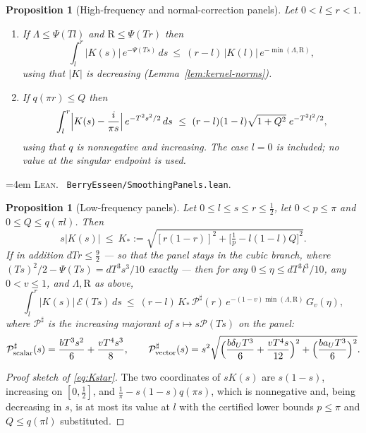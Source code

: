 \documentclass[10pt,a4paper]{article}
\theoremstyle{plain}
\newtheorem{proposition}[theorem]{Proposition}
\theoremstyle{definition}
\newcommand{\file}[1]{\texttt{#1}}
\newenvironment{leanref}%
  {\par\addvspace{3pt}\begingroup\sloppy\emergencystretch=4em
   \noindent\footnotesize\textsc{Lean.}\ \ignorespaces}%
  {\par\endgroup\addvspace{3pt}}
\begin{document}
\begin{proposition}[High-frequency and normal-correction panels]
\label{prop:high-normal-panel}
Let $0<l\le r<1$.
\begin{enumerate}[label=(\alph*),leftmargin=2.4em]
\item If $\Lambda\le\Psi(Tl)$ and $\mathrm{R}\le\Psi(Tr)$ then
  \[
    \int_l^r |K(s)|\,e^{-\Psi(Ts)}\,ds
    \ \le\ (r-l)\,|K(l)|\,e^{-\min(\Lambda,\mathrm R)} ,
  \]
  using that $|K|$ is decreasing (Lemma~\ref{lem:kernel-norms}).
\item If $q(\pi r)\le Q$ then
  \[
    \int_l^r \Bigl|K(s)-\frac{i}{\pi s}\Bigr|\,e^{-T^2s^2/2}\,ds
    \ \le\ (r-l)(1-l)\sqrt{1+Q^2}\;e^{-T^2l^2/2} ,
  \]
  using that $q$ is nonnegative and increasing. The case $l=0$ is included; no
  value at the singular endpoint is used.
\end{enumerate}
\end{proposition}

\begin{leanref}
\file{BerryEsseen/SmoothingPanels.lean}.
\end{leanref}

\begin{proposition}[Low-frequency panels]\label{prop:low-panel}
Let $0\le l\le s\le r\le\tfrac12$, let $0<p\le\pi$ and $0\le Q\le q(\pi l)$.
Then
\begin{equation}\label{eq:Kstar}
  s|K(s)| \ \le\ K_* := \sqrt{[r(1-r)]^2+\bigl[\tfrac1p-l(1-l)Q\bigr]^2} .
\end{equation}
If in addition $dTr\le\tfrac92$ --- so that the panel stays in the cubic branch,
where $(Ts)^2/2-\Psi(Ts)=dT^3s^3/10$ exactly --- then for any
$0\le\eta\le dT^3l^3/10$, any $0<v\le1$, and $\Lambda,\mathrm R$ as above,
\[
  \int_l^r |K(s)|\,\mathcal E(Ts)\,ds
  \ \le\ (r-l)\,K_*\,\mathcal P^\sharp(r)\,
    e^{-(1-v)\min(\Lambda,\mathrm R)}\,G_v(\eta),
\]
where $\mathcal P^\sharp$ is the increasing majorant of $s\mapsto s\mathcal P(Ts)$
on the panel:
\[
  \mathcal P^\sharp_{\mathrm{scalar}}(s) = \frac{bT^3s^2}{6}+\frac{vT^4s^3}{8},
  \qquad
  \mathcal P^\sharp_{\mathrm{vector}}(s) = s^2\sqrt{
    \Bigl(\frac{b\delta_UT^3}{6}+\frac{vT^4s}{12}\Bigr)^2
    + \Bigl(\frac{b a_U T^3}{6}\Bigr)^2 } .
\]
\end{proposition}

\begin{proof}[Proof sketch of \eqref{eq:Kstar}]
The two coordinates of $sK(s)$ are $s(1-s)$, increasing on $[0,\tfrac12]$, and
$\tfrac1\pi-s(1-s)q(\pi s)$, which is nonnegative and, being decreasing in $s$,
is at most its value at $l$ with the certified lower bounds $p\le\pi$ and
$Q\le q(\pi l)$ substituted.
\end{proof}
\end{document}
